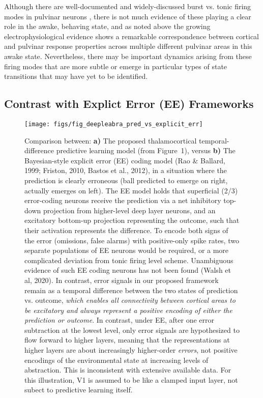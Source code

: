 \documentclass[11pt,twoside]{article}
\newif\myifpdf
\begin{document}
Although there are well-documented and widely-discussed burst vs. tonic firing modes in pulvinar neurons \citep{ShermanGuillery06}, there is not much evidence of these playing a clear role in the awake, behaving state, and as noted above the growing electrophysiological evidence shows a remarkable correspondence between cortical and pulvinar response properties across multiple different pulvinar areas in this awake state.  Nevertheless, there may be important dynamics arising from these firing modes that are more subtle or emerge in particular types of state transitions that may have yet to be identified.

\subsection{Contrast with Explict Error (EE) Frameworks}

\begin{figure}
  \centering\texttt{[image: figs/fig\_deepleabra\_pred\_vs\_explicit\_err]}
  \caption{Comparison between: {\bf a)} The proposed thalamocortical temporal-difference predictive learning model (from Figure~1), versus {\bf b)} The Bayesian-style explicit error (EE) coding model (Rao \& Ballard, 1999; Friston, 2010, Bastos et al., 2012), in a situation where the prediction is clearly erroneous (ball predicted to emerge on right, actually emerges on left).  The EE model holds that superficial (2/3) error-coding neurons receive the prediction via a net inhibitory top-down projection from higher-level deep layer neurons, and an excitatory bottom-up projection representing the outcome, such that their activation represents the difference.  To encode both signs of the error (omissions, false alarms) with positive-only spike rates, two separate populations of EE neurons would be required, or a more complicated deviation from tonic firing level scheme.  Unambiguous evidence of such EE coding neurons has not been found (Walsh et al, 2020).  In contrast, error signals in our proposed framework remain as a temporal difference between the two states of prediction vs. outcome, \emph{which enables all connectivity between cortical areas to be excitatory and always represent a positive encoding of either the prediction or outcome}.  In contrast, under EE, after one error subtraction at the lowest level, only error signals are hypothesized to flow forward to higher layers, meaning that the representations at higher layers are about increasingly higher-order \emph{errors}, not positive encodings of the environmental state at increasing levels of abstraction.  This is inconsistent with extensive available data.  For this illustration, V1 is assumed to be like a clamped input layer, not subect to predictive learning itself.}
  \label{fig.ee}
\end{figure}
\end{document}
